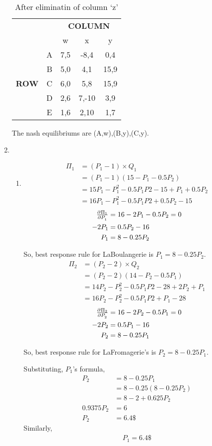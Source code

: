 \documentclass[a4paper,12pt]{article}
\begin{document}
\begin{enumerate}
\begin{table}[H]
\centering
\begin{tabular}{@{}ccccc@{}}
\toprule
\multicolumn{2}{c}{} & \multicolumn{3}{c}{\bfseries COLUMN}\\
\multicolumn{2}{c}{} & w & x & y\\
\multirow{5}{*}{\bfseries ROW} & A & 7,5 & -8,4 & 0,4\\
 & B & 5,0 & 4,1 & 15,9\\
 & C & 6,0 & 5,8 & 15,9\\
 & D & 2,6 & 7,-10 & 3,9\\
 & E & 1,6 & 2,10 & 1,7\\
 \bottomrule
\end{tabular}
\caption{After eliminatin of column `z'}
\end{table}
The nash equilibriums are (A,w),(B,y),(C,y).

\item%
\begin{enumerate}
\item
\begin{align*}
\Pi_1 &= (P_1-1)\times Q_1\\
&=(P_1-1)(15-P_1-0.5P_2)\\
&=15P_1-P_1^2-0.5P_1P2-15+P_1+0.5P_2\\
&=16P_1-P_1^2-0.5P_1P2+0.5P_2-15
\end{align*}
\begin{align*}
\pd{\Pi_1}{P_1} &= 16-2P_1-0.5P_2=0\\
-2P_1 &= 0.5P_2-16\\
P_1 &= 8-0.25P_2
\end{align*}

So, best response rule for LaBoulangerie is $P_1 = 8-0.25P_2$.
\begin{align*}
\Pi_2 &= (P_2-2)\times Q_2\\
&=(P_2-2)(14-P_2-0.5P_1)\\
&=14P_2-P_2^2-0.5P_1P2-28+2P_2+P_1\\
&=16P_2-P_2^2-0.5P_1P2+P_1-28
\end{align*}
\begin{align*}
\pd{\Pi_2}{P_2} &= 16-2P_2-0.5P_1=0\\
-2P_2 &= 0.5P_1-16\\
P_2 &= 8-0.25P_1
\end{align*}

So, best response rule for LaFromagerie’s is $P_2 = 8-0.25P_1$.

Substituting, $P_1$'s formula,
\begin{align*}
P_2 &= 8-0.25P_1\\
&= 8-0.25(8-0.25P_2)\\
&=8-2+0.625P_2\\
0.9375P_2 &= 6\\
P_2 &= 6.4\$
\end{align*}
Similarly,
\begin{align*}
P_1 = 6.4\$
\end{align*}


\end{enumerate}
\end{enumerate}
\end{document}
